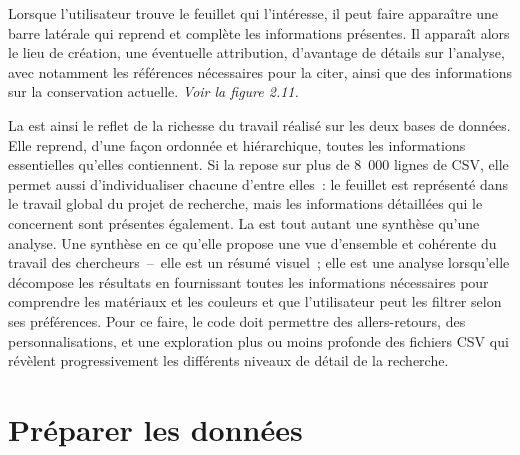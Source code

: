 Lorsque l’utilisateur trouve le feuillet qui l’intéresse, il peut faire apparaître une barre latérale qui reprend et complète les informations présentes. Il apparaît alors le lieu de création, une éventuelle attribution, d’avantage de détails sur l’analyse, avec notamment les références nécessaires pour la citer, ainsi que des informations sur la conservation actuelle. \textit{Voir la figure 2.11.}\par

La  est ainsi le reflet de la richesse du travail réalisé sur les deux bases de données. Elle reprend, d’une façon ordonnée et hiérarchique, toutes les informations essentielles qu’elles contiennent. Si la  repose sur plus de 8~000 lignes de CSV, elle permet aussi d’individualiser chacune d’entre elles~: le feuillet est représenté dans le travail global du projet de recherche, mais les informations détaillées qui le concernent sont présentes également. La  est tout autant une synthèse qu’une analyse. Une synthèse en ce qu’elle propose une vue d’ensemble et cohérente du travail des chercheurs~–~elle est un résumé visuel~; elle est une analyse lorsqu’elle décompose les résultats en fournissant toutes les informations nécessaires pour comprendre les matériaux et les couleurs et que l’utilisateur peut les filtrer selon ses préférences. Pour ce faire, le code doit permettre des allers-retours, des personnalisations, et une exploration plus ou moins profonde des fichiers CSV qui révèlent progressivement les différents niveaux de détail de la recherche. \newpage

\section{Préparer les données}

